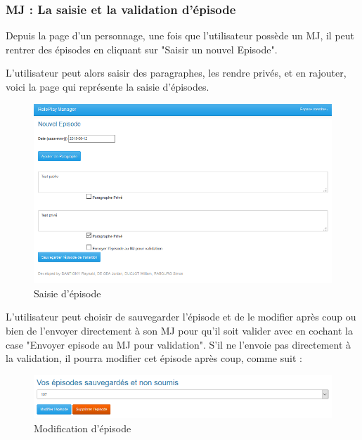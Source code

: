 \documentclass[a4paper,oneside,10pt]{article}
\begin{document}
\subsubsection{MJ : La saisie et la validation d'épisode}

Depuis la page d'un personnage, une fois que l'utilisateur possède un MJ, il peut rentrer des épisodes en cliquant sur "Saisir un nouvel Episode".

L'utilisateur peut alors saisir des paragraphes, les rendre privés, et en rajouter, voici la page qui représente la saisie d'épisodes.
\begin{figure}[H]
	\begin{center}
		\includegraphics[width=\textwidth]{images/manuel/saisiepisode.png}  
		\caption{Saisie d'épisode}
	\end{center}
\end{figure}

L'utilisateur peut choisir de sauvegarder l'épisode et de le modifier après coup ou bien de l'envoyer directement à son MJ pour qu'il soit valider avec en cochant la case "Envoyer episode au MJ pour validation". S'il ne l'envoie pas directement à la validation, il pourra modifier cet épisode après coup, comme suit :
\begin{figure}[H]
	\begin{center}
		\includegraphics[width=\textwidth]{images/manuel/modifepisode.png}  
		\caption{Modification d'épisode}
	\end{center}
\end{figure}
\end{document}

